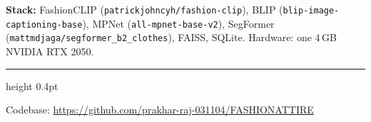 \documentclass[10pt,a4paper]{article}
\newcommand{\tcode}[1]{\texttt{\small #1}}
\newcommand{\repourl}{https://github.com/prakhar-raj-031104/FASHIONATTIRE}
\begin{document}
\textbf{Stack:} FashionCLIP (\tcode{patrickjohncyh/fashion-clip}), BLIP
(\tcode{blip-image-captioning-base}), MPNet (\tcode{all-mpnet-base-v2}), SegFormer
(\tcode{mattmdjaga/segformer\_b2\_clothes}), FAISS, SQLite. Hardware: one 4\,GB NVIDIA RTX 2050.

\vspace{4pt}
\hrule height 0.4pt
\vspace{4pt}
\begin{center}\small
Codebase: \href{\repourl}{\repourl}
\end{center}
\end{document}
